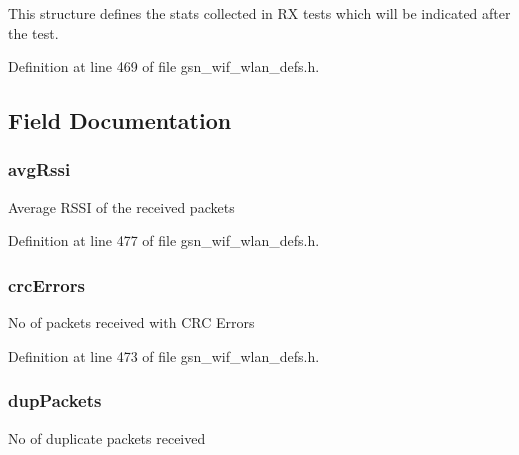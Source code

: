 This structure defines the stats collected in RX tests which will be indicated after the test. 

Definition at line 469 of file gsn\_\-wif\_\-wlan\_\-defs.h.



\subsection{Field Documentation}
\hypertarget{a00419_a56446535fa6c2eb154a14f04a0d56b37}{
\subsubsection[{avgRssi}]{ {\bf avgRssi}}}
\label{a00419_a56446535fa6c2eb154a14f04a0d56b37}
Average RSSI of the received packets 

Definition at line 477 of file gsn\_\-wif\_\-wlan\_\-defs.h.

\hypertarget{a00419_ac9b3007dce9f0a2ed0beb12a555714c2}{
\subsubsection[{crcErrors}]{ {\bf crcErrors}}}
\label{a00419_ac9b3007dce9f0a2ed0beb12a555714c2}
No of packets received with CRC Errors 

Definition at line 473 of file gsn\_\-wif\_\-wlan\_\-defs.h.

\hypertarget{a00419_a421dbc2a77d6e1a45c530621ee89cfbc}{
\subsubsection[{dupPackets}]{ {\bf dupPackets}}}
\label{a00419_a421dbc2a77d6e1a45c530621ee89cfbc}
No of duplicate packets received 

